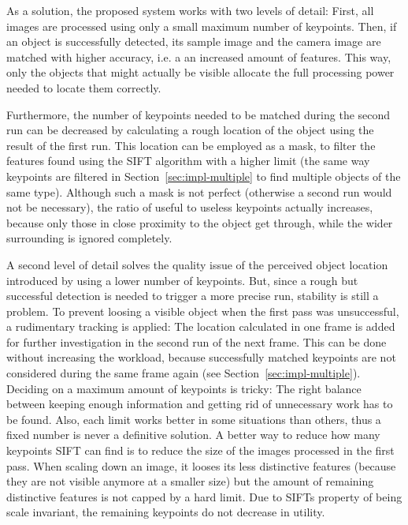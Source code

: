 As a solution, the proposed system works with two levels of detail: First, all images are processed using only a small maximum number of keypoints. Then, if an object is successfully detected, its sample image and the camera image are matched with higher accuracy, i.e. a an increased amount of features. This way, only the objects that might actually be visible allocate the full processing power needed to locate them correctly.

Furthermore, the number of keypoints needed to be matched during the second run can be decreased by calculating a rough location of the object using the result of the first run. This location can be employed as a mask, to filter the features found using the SIFT algorithm with a higher limit (the same way keypoints are filtered in Section~\ref{sec:impl-multiple} to find multiple objects of the same type). Although such a mask is not perfect (otherwise a second run would not be necessary), the ratio of useful to useless keypoints actually increases, because only those in close proximity to the object get through, while the wider surrounding is ignored completely.

A second level of detail solves the quality issue of the perceived object location introduced by using a lower number of keypoints. But, since a rough but successful detection is needed to trigger a more precise run, stability is still a problem. To prevent loosing a visible object when the first pass was unsuccessful, a rudimentary tracking is applied: The location calculated in one frame is added for further investigation in the second run of the next frame. This can be done without increasing the workload, because successfully matched keypoints are not considered during the same frame again (see Section~\ref{sec:impl-multiple}). \\

Deciding on a maximum amount of keypoints is tricky: The right balance between keeping enough information and getting rid of unnecessary work has to be found. Also, each limit works better in some situations than others, thus a fixed number is never a definitive solution. A better way to reduce how many keypoints SIFT can find is to reduce the size of the images processed in the first pass. When scaling down an image, it looses its less distinctive features (because they are not visible anymore at a smaller size) but the amount of remaining distinctive features is not capped by a hard limit. Due to SIFTs property of being scale invariant, the remaining keypoints do not decrease in utility.

